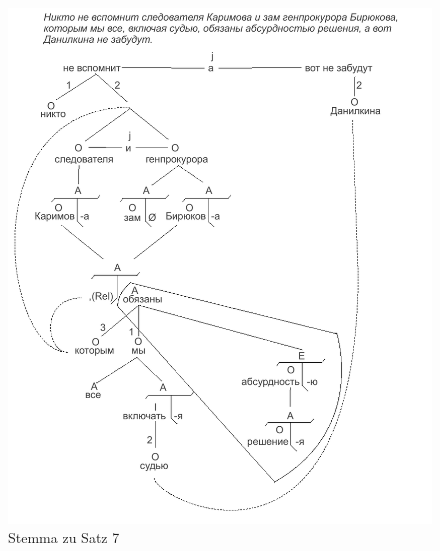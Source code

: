 \begin{figure}
    \begin{center}
        \includegraphics{anhang_a/stemma7}
        \caption{Stemma zu Satz 7}
        \label{fig:stemma7}
    \end{center}
\end{figure}

